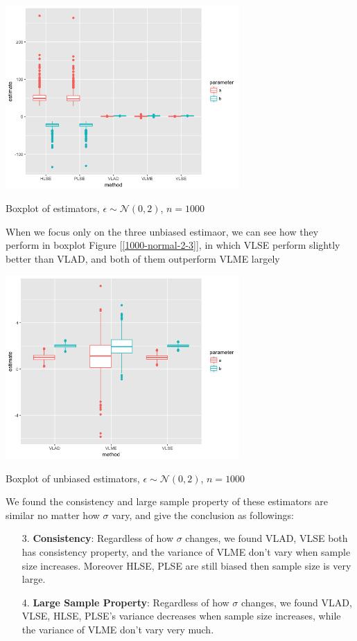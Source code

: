 \documentclass[twoside]{article}
\begin{document}
\begin{center}
\makeatletter
\def\@captype{figure}
\makeatother
\includegraphics [height=7cm]{code/n=1000,uniform,normal_2.png}
\caption{Boxplot of estimators, $\epsilon \sim \mathcal{N}(0,2)$, $n=1000$}
\label{1000-normal-2}
\end{center}

When we focus only on the three unbiased estimaor, we can see how they perform in boxplot Figure [\ref{1000-normal-2-3}], in which VLSE perform slightly better than VLAD, and both of them outperform VLME largely

\begin{center}
\makeatletter
\def\@captype{figure}
\makeatother
\includegraphics [height=7cm]{code/special/n=1000,uniformed,normal_2,3.png}
\caption{Boxplot of unbiased estimators, $\epsilon \sim \mathcal{N}(0,2)$, $n=1000$}
\label{1000-normal-2-3}
\end{center}

We found the consistency and large sample property of these estimators are similar no matter how $\sigma$ vary, and give the conclusion as followings:

\begin{itemize}
  \item [3.] \textbf{Consistency}: Regardless of how $\sigma$ changes, we found VLAD, VLSE both has consistency property, and the variance of VLME don't vary when sample size increases. Moreover HLSE, PLSE are still biased then sample size is very large.
  \item [4.] \textbf{Large Sample Property}: Regardless of how $\sigma$ changes, we found VLAD, VLSE, HLSE, PLSE's variance decreases when sample size increases, while the variance of VLME don't vary very much.
\end{itemize}
\end{document}
